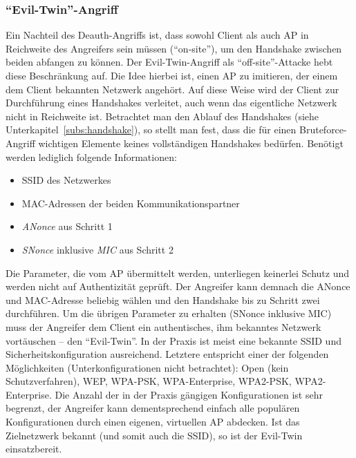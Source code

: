 \subsubsection{\enquote{Evil-Twin}-Angriff}\label{subs:evil-twin-attack}
Ein Nachteil des Deauth-Angriffs ist, dass sowohl Client als auch AP in Reichweite des Angreifers sein müssen (\enquote{on-site}), um den Handshake zwischen beiden abfangen zu können. Der Evil-Twin-Angriff als \enquote{off-site}-Attacke hebt diese Beschränkung auf. Die Idee hierbei ist, einen AP zu imitieren, der einem dem Client bekannten Netzwerk angehört. Auf diese Weise wird der Client zur Durchführung eines Handshakes verleitet, auch wenn das eigentliche Netzwerk nicht in Reichweite ist. 
Betrachtet man den Ablauf des Handshakes (siehe Unterkapitel~\ref{subs:handshake}), so stellt man fest, dass die für einen Bruteforce-Angriff wichtigen Elemente keines vollständigen Handshakes bedürfen. Benötigt werden lediglich folgende Informationen:
\begin{itemize}
	\item SSID des Netzwerkes 
	\item MAC-Adressen der beiden Kommunikationspartner
	\item \textit{ANonce} aus Schritt 1
	\item \textit{SNonce} inklusive \textit{MIC} aus Schritt 2
\end{itemize}
Die Parameter, die vom AP übermittelt werden, unterliegen keinerlei Schutz und werden nicht auf Authentizität geprüft.
Der Angreifer kann demnach die ANonce und MAC-Adresse beliebig wählen und den Handshake bis zu Schritt zwei durchführen.
Um die übrigen Parameter zu erhalten (SNonce inklusive MIC) muss der Angreifer dem Client ein authentisches, ihm bekanntes Netzwerk vortäuschen -- den \enquote{Evil-Twin}. In der Praxis ist meist eine bekannte SSID und Sicherheitskonfiguration ausreichend. Letztere entspricht einer der folgenden Möglichkeiten (Unterkonfigurationen nicht betrachtet): Open (kein Schutzverfahren), WEP, WPA-PSK, WPA-Enterprise, WPA2-PSK, WPA2-Enterprise.
Die Anzahl der in der Praxis gängigen Konfigurationen ist sehr begrenzt, der Angreifer kann dementsprechend einfach alle populären Konfigurationen durch einen eigenen, virtuellen AP abdecken. Ist das Zielnetzwerk bekannt (und somit auch die SSID), so ist der Evil-Twin einsatzbereit.

